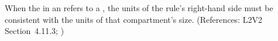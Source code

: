 When the  in an \AssignmentRule refers to a \Compartment,
the units of the rule's right-hand side must be consistent with the units
of that compartment's size.  (References: L2V2 Section~4.11.3;
)
